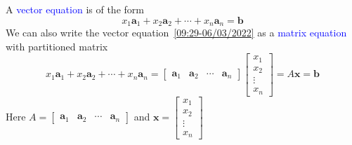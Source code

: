 \documentclass{beamer}
\theoremstyle{definition}
\theoremstyle{remark}
\begin{document}
\begin{frame}[t]
\begin{definition}
A \textcolor{blue}{vector equation} is of the form
\begin{equation}\label{09:29-06/03/2022}
x_1\mathbf a_1+x_2\mathbf a_2+\cdots+x_n\mathbf a_n=\mathbf b
\end{equation}\pause
We can also write the vector equation~\eqref{09:29-06/03/2022} as a \textcolor{blue}{matrix equation} with partitioned matrix
\[
x_1\mathbf a_1+x_2\mathbf a_2+\cdots+x_n\mathbf a_n=\begin{bmatrix}
\mathbf a_1&\mathbf a_2&\cdots&\mathbf a_n
\end{bmatrix}\begin{bmatrix}
x_1\\x_2\\\vdots\\x_n
\end{bmatrix}=A\mathbf x=\mathbf b
\]
Here $A=\begin{bmatrix}
\mathbf a_1&\mathbf a_2&\cdots&\mathbf a_n
\end{bmatrix}$ and $\mathbf x=\begin{bmatrix}
x_1\\x_2\\\vdots\\x_n
\end{bmatrix}$
\end{definition}
\end{frame}
\end{document}
